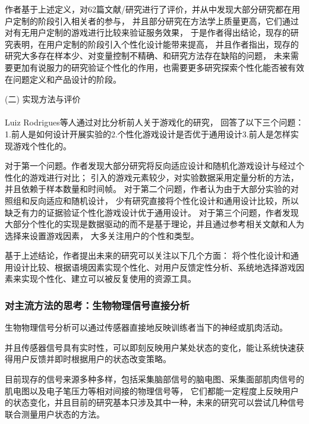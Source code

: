 \documentclass{article}
\begin{document}
            作者基于上述定义，对62篇文献/研究进行了评价，并从中发现大部分研究都在用户定制的阶段引入相关者的参与，
            并且部分研究在方法学上质量更高，它们通过对有无用户定制的游戏进行比较来验证服务效果，
            于是作者得出结论，现存的研究表明，在用户定制的阶段引入个性化设计能带来提高，
            并且作者指出，现存的研究大多存在样本少、对变量控制不精确、和研究方法存在缺陷的问题，
            未来需要更加有说服力的研究验证个性化的作用，也需要更多研究探索个性化能否被有效在问题定义和产品设计的阶段。

            (二) 实现方法与评价\paragraph{}
            Luiz Rodrigues等人通过对比分析前人关于游戏化的研究，
            回答了以下三个问题：1.前人是如何设计开展实验的2.个性化游戏设计是否优于通用设计3.前人是怎样实现游戏个性化的。

            对于第一个问题。作者发现大部分研究将反向适应设计和随机化游戏设计与经过个性化的游戏进行对比；
            引入的游戏元素较少，对实验数据采用定量分析的方法，并且依赖于样本数量和时间帧。
            对于第二个问题，作者认为由于大部分实验的对照组和反向适应和随机设计，
            少有研究直接将个性化设计和通用设计比较，所以缺乏有力的证据验证个性化游戏设计优于通用设计。
            对于第三个问题，作者发现大部分个性化的实现是数据驱动的而不是基于理论，并且通过参考相关文献和人为选择来设置游戏因素，
            大多关注用户的个性和类型。

            基于上述结论，作者提出未来的研究可以关注以下几个方面：
            将个性化设计和通用设计比较、根据语境因素实现个性化、对用户反馈定性分析、系统地选择游戏因素来实现个性化、建立可以被反复使用的资源工具。

            \subsubsection{对主流方法的思考：生物物理信号直接分析}
            生物物理信号分析可以通过传感器直接地反映训练者当下的神经或肌肉活动。

            并且传感器信号具有实时性，可以即刻反映用户某处状态的变化，能让系统快速获得用户反馈并即时根据用户的状态改变策略。

            目前现存的信号来源多种多样，包括采集脑部信号的脑电图、采集面部肌肉信号的肌电图以及电子笔压力等相对间接的物理信号等，
            它们都能一定程度上反映用户的状态变化，并且目前的研究基本只涉及其中一种，未来的研究可以尝试几种信号联合测量用户状态的方法。
\end{document}
